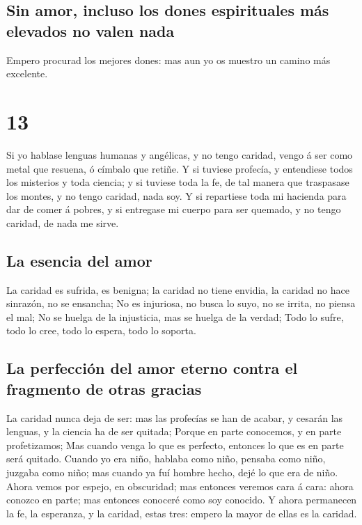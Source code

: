 \hypertarget{sin-amor-incluso-los-dones-espirituales-muxe1s-elevados-no-valen-nada}{%
\subsection{Sin amor, incluso los dones espirituales más elevados no
valen
nada}\label{sin-amor-incluso-los-dones-espirituales-muxe1s-elevados-no-valen-nada}}

 Empero procurad los mejores dones: mas aun yo os muestro
un camino más excelente.

\hypertarget{section-12}{%
\section{13}\label{section-12}}

 Si yo hablase lenguas humanas y angélicas, y no tengo
caridad, vengo á ser como metal que resuena, ó címbalo que retiñe.
 Y si tuviese profecía, y entendiese todos los misterios y
toda ciencia; y si tuviese toda la fe, de tal manera que traspasase los
montes, y no tengo caridad, nada soy.  Y si repartiese
toda mi hacienda para dar de comer á pobres, y si entregase mi cuerpo
para ser quemado, y no tengo caridad, de nada me sirve.

\hypertarget{la-esencia-del-amor}{%
\subsection{La esencia del amor}\label{la-esencia-del-amor}}

 La caridad es sufrida, es benigna; la caridad no tiene
envidia, la caridad no hace sinrazón, no se ensancha;  No
es injuriosa, no busca lo suyo, no se irrita, no piensa el mal;
 No se huelga de la injusticia, mas se huelga de la
verdad;  Todo lo sufre, todo lo cree, todo lo espera, todo
lo soporta.

\hypertarget{la-perfecciuxf3n-del-amor-eterno-contra-el-fragmento-de-otras-gracias}{%
\subsection{La perfección del amor eterno contra el fragmento de otras
gracias}\label{la-perfecciuxf3n-del-amor-eterno-contra-el-fragmento-de-otras-gracias}}

 La caridad nunca deja de ser: mas las profecías se han de
acabar, y cesarán las lenguas, y la ciencia ha de ser quitada;
 Porque en parte conocemos, y en parte profetizamos;
 Mas cuando venga lo que es perfecto, entonces lo que es
en parte será quitado.  Cuando yo era niño, hablaba como
niño, pensaba como niño, juzgaba como niño; mas cuando ya fuí hombre
hecho, dejé lo que era de niño.  Ahora vemos por espejo,
en obscuridad; mas entonces veremos cara á cara: ahora conozco en parte;
mas entonces conoceré como soy conocido.  Y ahora
permanecen la fe, la esperanza, y la caridad, estas tres: empero la
mayor de ellas es la caridad.

